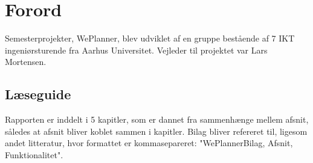 \chapter{Forord}

Semesterprojekter, WePlanner, blev udviklet af en gruppe bestående af 7 IKT ingeniørsturende fra Aarhus Universitet. Vejleder til projektet var Lars Mortensen.

\section{Læseguide}
Rapporten er inddelt i 5 kapitler, som er dannet fra sammenhænge mellem afsnit, således at afsnit bliver koblet sammen i kapitler. Bilag bliver refereret til, ligesom andet litteratur, hvor formattet er kommasepareret: "WePlannerBilag, Afsnit, Funktionalitet".
